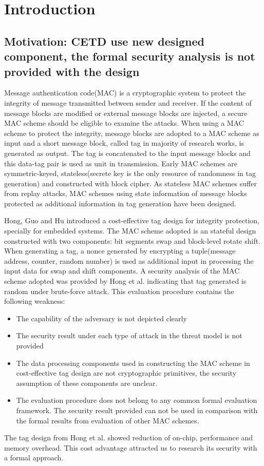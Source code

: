 \documentclass{article}
\begin{document}
\section{Introduction}

\subsection{Motivation: CETD use new designed component, the formal security
analysis is not provided with the design}
Message authentication code(MAC) is a cryptographic system to protect the integrity of message transmitted between sender and receiver. If the content of message blocks are modified or external message blocks are injected, a secure MAC scheme should be eligible to examine the attacks. When using a MAC scheme to protect the integrity, message blocks are adopted to a MAC scheme as input and a short message block, called tag in majority of research works, is generated as output. The tag is concatenated to the input message blocks and this data-tag pair is used as unit in transmission. Early MAC schemes are symmetric-keyed, stateless(secrete key is the only resource of randomness in tag generation) and constructed with block cipher. As stateless MAC schemes suffer from replay attacks, MAC schemes using state information of message blocks protected as additional information in tag generation have been designed.

Hong, Guo and Hu\cite{cetd} introduced a cost-effective tag design for integrity protection, specially for embedded systems. The MAC scheme adopted is an stateful design constructed with two components: bit segments swap and block-level rotate shift. When generating a tag, a nonce generated by encrypting a tuple(message address, counter, random number) is used as additional input in processing the input data for swap and shift components. 
A security analysis of the MAC scheme adopted was provided by Hong et al. indicating that tag generated is random under brute-force attack. This evaluation procedure contains the following weakness:
\begin{itemize}
	\item The capability of the adversary is not depicted clearly
	\item The security result under each type of attack in the threat model is not provided
	\item The data processing components used in constructing the MAC scheme in cost-effective tag design are not cryptographic primitives, the security assumption of these components are unclear.
	\item The evaluation procedure does not belong to any common formal evaluation framework. The security result provided can not be used in comparison with the formal results from evaluation of other MAC schemes.
\end{itemize}
The tag design from Hong et al. showed  reduction of on-chip, performance and memory overhead. This cost advantage attracted us to research its security with a formal approach.
\end{document}
